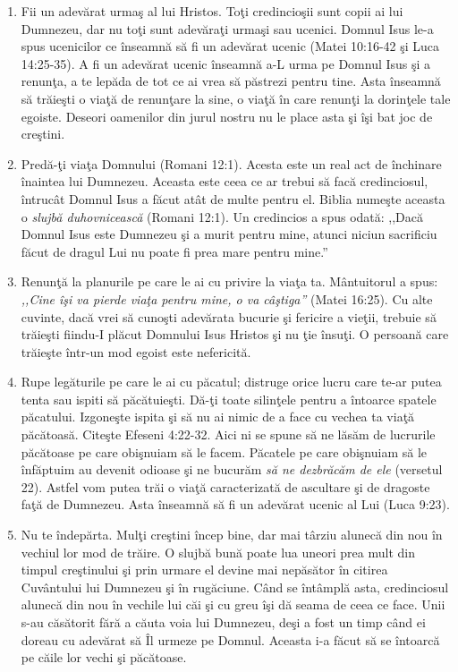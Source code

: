 	\begin{enumerate}
       
       \item Fii un adevărat urmaş al lui Hristos. Toţi credincioşii sunt copii ai lui Dumnezeu, dar nu toţi sunt adevăraţi urmaşi sau ucenici. Domnul Isus le-a spus ucenicilor ce înseamnă să fi un adevărat ucenic (Matei 10:16-42 şi Luca 14:25-35). A fi un adevărat ucenic înseamnă a-L urma pe Domnul Isus şi a renunţa, a te lepăda de tot ce ai vrea să păstrezi pentru tine. Asta înseamnă să trăieşti o viaţă de renunţare la sine, o viaţă în care renunţi la dorinţele tale egoiste. Deseori oamenilor din jurul nostru nu le place asta şi îşi bat joc de creştini.
       
       \item Predă-ţi viaţa Domnului (Romani 12:1). Acesta este un real act de închinare înaintea lui Dumnezeu. Aceasta este ceea ce ar trebui să facă credinciosul, întrucât Domnul Isus a făcut atât de multe pentru el. Biblia numeşte aceasta o \textit{slujbă duhovnicească} (Romani 12:1). Un credincios a spus odată: ,,Dacă Domnul Isus este Dumnezeu şi a murit pentru mine, atunci niciun sacrificiu făcut de dragul Lui nu poate fi prea mare pentru mine.''
       
       \item Renunţă la planurile pe care le ai cu privire la viaţa ta. Mântuitorul a spus: \textit{,,Cine îşi va pierde viaţa pentru mine, o va câştiga''} (Matei 16:25). Cu alte cuvinte, dacă vrei să cunoşti adevărata bucurie şi fericire a vieţii, trebuie să trăieşti fiindu-I plăcut Domnului Isus Hristos şi nu ţie însuţi. O persoană care trăieşte într-un mod egoist este nefericită.
       
       \item Rupe legăturile pe care le ai cu păcatul; distruge orice lucru care te-ar putea tenta sau ispiti să păcătuieşti. Dă-ţi toate silinţele pentru a întoarce spatele păcatului. Izgoneşte ispita şi să nu ai nimic de a face cu vechea ta viaţă păcătoasă. Citeşte Efeseni 4:22-32. Aici ni se spune să ne lăsăm de lucrurile păcătoase pe care obişnuiam să le facem. Păcatele pe care obişnuiam să le înfăptuim au devenit odioase şi ne bucurăm \textit{să ne dezbrăcăm de ele} (versetul 22). Astfel vom putea trăi o viaţă caracterizată de ascultare şi de dragoste faţă de Dumnezeu. Asta înseamnă să fi un adevărat ucenic al Lui (Luca 9:23).
       
       \item Nu te îndepărta. Mulţi creştini încep bine, dar mai târziu alunecă din nou în vechiul lor mod de trăire. O slujbă bună poate lua uneori prea mult din timpul creştinului şi prin urmare el devine mai nepăsător în citirea Cuvântului lui Dumnezeu şi în rugăciune. Când se întâmplă asta, credinciosul alunecă din nou în vechile lui căi şi cu greu îşi dă seama de ceea ce face. Unii s-au căsătorit fără a căuta voia lui Dumnezeu, deşi a fost un timp când ei doreau cu adevărat să Îl urmeze pe Domnul.  Aceasta i-a făcut să se întoarcă pe căile lor vechi şi păcătoase.
       

\end{enumerate}
